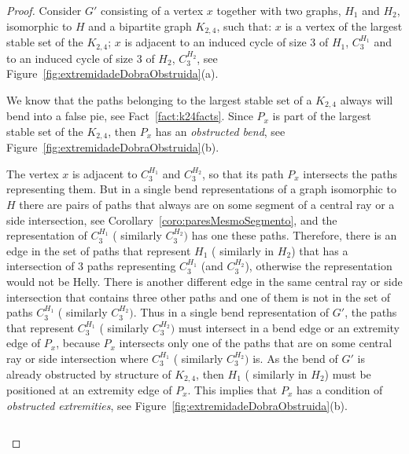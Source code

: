 \documentclass[
submission
]{dmtcs-episciences}
\begin{document}
\begin{proof} %
Consider $G'$ consisting of a vertex $x$ together with two graphs, $ H_1 $ and $ H_2 $, isomorphic to $H$ and a bipartite graph $K_{2,4}$, such that: $x$ is a vertex of the largest stable set of the $K_{2,4}$; $x$ is adjacent to an induced cycle of size 3 of $H_1$, $C_3^{H_1}$ and to an induced cycle of size 3 of $H_2$, $ C_3^{H_2}$, see Figure~\ref{fig:extremidadeDobraObstruida}(a).

We know that the paths belonging to the largest stable set of a $K_{2,4}$ always will bend into a false pie, see Fact~\ref{fact:k24facts}. Since $P_{x}$ is part of the largest stable set of the $K_{2,4}$, then $P_{x}$ has an \emph {obstructed bend}, see Figure~\ref{fig:extremidadeDobraObstruida}(b). 

The vertex $x$ is adjacent to $ C_{3}^{H_1}$ and $ C_3^{H_2}$, so that its path $ P_{x} $ intersects the paths representing them.  But in a single bend representations of a graph isomorphic to $H$ there are pairs of paths that always are on some segment of a central ray or a side intersection, see Corollary~\ref{coro:paresMesmoSegmento}, and the representation of $C_{3}^{H_1}$ ( similarly $C_3^{H_2})$ has one these paths. Therefore, there is an edge in the set of paths that represent ${H_1}$ ( similarly in ${H_2}$) that has a intersection of 3 paths representing $ C_{3}^{H_1}$ (and $ C_3^{H_2}$), otherwise the representation would not be Helly. There is another different edge in the same central ray or side intersection that contains three other paths and one of them is not in the set of paths  $C_{3}^{H_1}$ ( similarly $C_3^{H_2})$. Thus in a single bend representation of $G'$, the paths that represent  $C_{3}^{H_1}$ ( similarly $C_3^{H_2})$ must intersect in a bend edge or an extremity edge of $P_{x}$, because $P_{x}$ intersects only one of the paths that are on some central ray or side intersection where  $C_{3}^{H_1}$ ( similarly $C_3^{H_2})$ is. As the bend of $G'$ is already obstructed by structure of $K_{2,4}$, then ${H_1}$ ( similarly in ${H_2}$) must be positioned at an extremity edge of $P_{x}$. This implies that $ P_{x} $ has a condition of \emph{obstructed extremities}, see Figure~\ref{fig:extremidadeDobraObstruida}(b).
%
\begin{figure}[h]
  \centering
  \begin{tabular}{p{6cm} p{1cm} p{6cm}}

\end{tabular}
\end{figure}
\end{proof}
\end{document}
